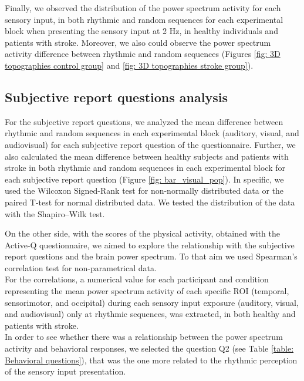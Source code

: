 Finally, we observed the distribution of the power spectrum activity for each sensory input, in both rhythmic and random sequences for each experimental block when presenting the sensory input at 2 Hz, in healthy individuals and patients with stroke. Moreover, we also could observe the power spectrum activity difference between rhythmic and random sequences (Figures \ref{fig: 3D topographies control group} and \ref{fig: 3D topographies stroke group}). 

\subsection{Subjective report questions analysis}
For the subjective report questions, we analyzed the mean difference between rhythmic and random sequences in each experimental block (auditory, visual, and audiovisual) for each subjective report question of the questionnaire. Further, we also calculated the mean difference between healthy subjects and patients with stroke in both rhythmic and random sequences in each experimental block for each subjective report question (Figure \ref{fig: bar_visual_pop}). In specific, we used the Wilcoxon Signed-Rank test for non-normally distributed data or the paired T-test for normal distributed data. We tested the distribution of the data with the Shapiro–Wilk test.

On the other side, with the scores of the physical activity, obtained with the Active-Q questionnaire, we aimed to explore the relationship with the subjective report questions and the brain power spectrum. To that aim we used Spearman’s correlation test for non-parametrical data. \\
For the correlations, a numerical value for each participant and condition representing the mean power spectrum activity of each specific ROI (temporal, sensorimotor, and occipital) during each sensory input exposure (auditory, visual, and audiovisual) only at rhythmic sequences, was extracted, in both healthy and patients with stroke. \\
In order to see whether there was a relationship between the power spectrum activity and behavioral responses, we selected the question Q2 (see Table \ref{table: Behavioral questions}), that was the one more related to the rhythmic perception of the sensory input presentation. 